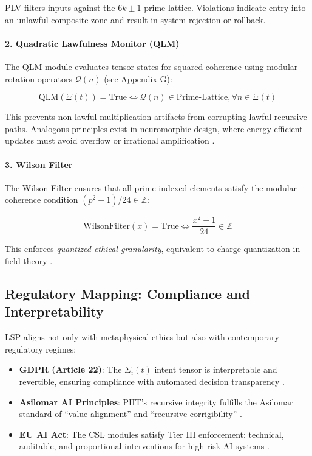 \documentclass[12]{amsart}
\theoremstyle{plain}
\begin{document}
PLV filters inputs against the $6k \pm 1$ prime lattice. Violations indicate entry into an unlawful composite zone and result in system rejection or rollback.

\paragraph{2. Quadratic Lawfulness Monitor (QLM)}

The QLM module evaluates tensor states for squared coherence using modular rotation operators $\mathcal{Q}(n)$ (see Appendix G):

\begin{equation}
\text{QLM}(\Xi(t)) = \text{True} \iff \mathcal{Q}(n) \in \text{Prime-Lattice}, \forall n \in \Xi(t)
\end{equation}

This prevents non-lawful multiplication artifacts from corrupting lawful recursive paths. Analogous principles exist in neuromorphic design, where energy-efficient updates must avoid overflow or irrational amplification \cite{boahen2005neuromorphic}.

\paragraph{3. Wilson Filter}

The Wilson Filter ensures that all prime-indexed elements satisfy the modular coherence condition $(p^2 - 1)/24 \in \mathbb{Z}$:

\begin{equation}
\text{WilsonFilter}(x) = \text{True} \iff \frac{x^2 - 1}{24} \in \mathbb{Z}
\end{equation}

This enforces \emph{quantized ethical granularity}, equivalent to charge quantization in field theory \cite{wilczek1987disorder}.

\subsection{Regulatory Mapping: Compliance and Interpretability}

LSP aligns not only with metaphysical ethics but also with contemporary regulatory regimes:

\begin{itemize}
    \item \textbf{GDPR (Article 22)}: The $\Sigma_i(t)$ intent tensor is interpretable and revertible, ensuring compliance with automated decision transparency \cite{goodman2017european}.
    \item \textbf{Asilomar AI Principles}: PIIT's recursive integrity fulfills the Asilomar standard of “value alignment” and “recursive corrigibility” \cite{futureoflife2017asilomar}.
    \item \textbf{EU AI Act}: The CSL modules satisfy Tier III enforcement: technical, auditable, and proportional interventions for high-risk AI systems \cite{european2021proposal}.
\end{itemize}
\end{document}

